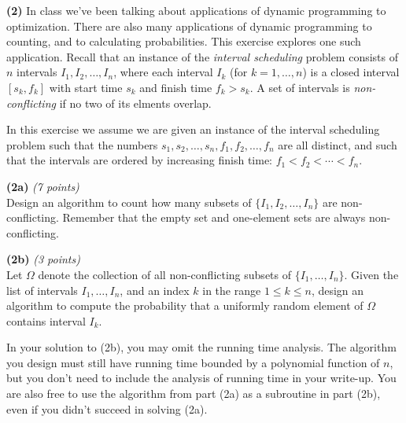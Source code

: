 \documentclass[12pt]{article}
\def\gap{0.1in}
\def\bigap{0.25in}
\begin{document}
\setlength{\parindent}{0in}
\addtolength{\parskip}{0.1cm}
\setlength{\fboxrule}{.5mm}\setlength{\fboxsep}{1.2mm}
\newlength{\boxlength}\setlength{\boxlength}{\textwidth}
\addtolength{\boxlength}{-4mm}
\begin{center}
\end{center}
\vspace{5mm}

{\bf (2)} 
In class we've been talking about applications of
dynamic programming to optimization. There are also
many applications of dynamic programming to counting,
and to calculating probabilities. This exercise explores
one such application. Recall that an instance of
the {\em interval scheduling} problem consists of
$n$ intervals $I_1,I_2,\ldots,I_n$, where each interval
$I_k$ (for $k=1,\ldots,n$) is a closed interval
$[s_k,f_k]$ with start time $s_k$ and finish time
$f_k > s_k$. A set of intervals is {\em non-conflicting}
if no two of its elments overlap. 

In this exercise
we assume we are given an instance of the interval
scheduling problem such that the numbers 
$s_1,s_2,\ldots,s_n,f_1,f_2,\ldots,f_n$ 
are all distinct, and such that the intervals
are ordered by increasing finish time:
$f_1 < f_2 < \cdots < f_n$.

\vskip \gap
{\bf (2a)} {\em (7 points)} \\
Design an algorithm to count how
many subsets of $\{I_1,I_2,\ldots,I_n\}$ are
non-conflicting. Remember that the empty set
and one-element sets are always non-conflicting.

\vskip \gap
{\bf (2b)} {\em (3 points)} \\
Let $\Omega$ denote the collection of all
non-conflicting subsets of $\{I_1,\ldots,I_n\}$.
Given the list of intervals $I_1,\ldots,I_n$, and
an index $k$ in the range $1 \le k \le n$, 
design an algorithm to compute the probability that
a uniformly random element of $\Omega$ contains
interval $I_k$.

In your solution to (2b), you may omit the running
time analysis. The algorithm you design must
still have running time bounded by a polynomial
function of $n$, but you don't need to include the
analysis of running time in your write-up. You
are also free to use the algorithm from part (2a)
as a subroutine in part (2b), even if you didn't
succeed in solving (2a).


\vskip \bigap

\end{document}
